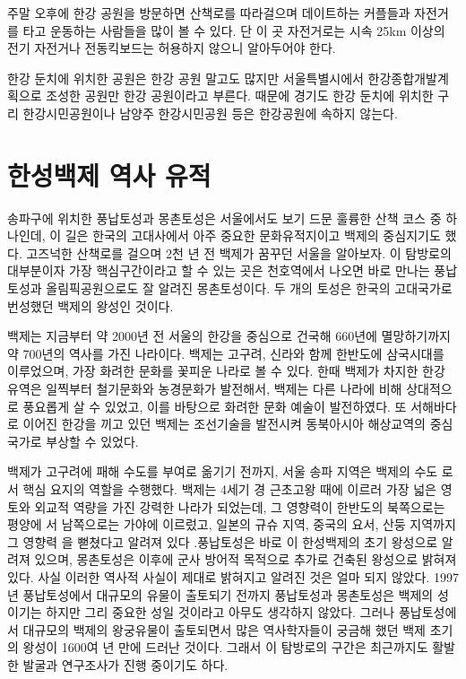 주말 오후에 한강 공원을 방문하면 산책로를 따라걸으며 데이트하는 커플들과 자전거를
타고 운동하는 사람들을 많이 볼 수 있다. 단 이 곳 자전거로는 시속 25km 이상의
전기 자전거나 전동킥보드는 허용하지 않으니 알아두어야 한다.

한강 둔치에 위치한 공원은 한강 공원 말고도 많지만 서울특별시에서 한강종합개발계획으로
조성한 공원만 한강 공원이라고 부른다. 때문에 경기도 한강 둔치에 위치한 구리
한강시민공원이나 남양주 한강시민공원 등은 한강공원에 속하지 않는다.


\section{한성백제 역사 유적}
송파구에 위치한 풍납토성과 몽촌토성은 서울에서도 보기 드문 훌륭한 산책 코스 중
하나인데, 이 길은 한국의 고대사에서 아주 중요한 문화유적지이고 백제의 중심지기도 했다.
고즈넉한 산책로를 걸으며 2천 년 전 백제가 꿈꾸던 서울을 알아보자.
이 탐방로의 대부분이자 가장 핵심구간이라고 할 수 있는 곳은 천호역에서 나오면 바로
만나는 풍납토성과 올림픽공원으로도 잘 알려진 몽촌토성이다. 두 개의 토성은 한국의
고대국가로 번성했던 백제의 왕성인 것이다.


백제는 지금부터 약 2000년 전 서울의 한강을 중심으로 건국해 660년에 멸망하기까지
약 700년의 역사를 가진 나라이다. 백제는 고구려, 신라와 함께 한반도에 삼국시대를
이루었으며, 가장 화려한 문화를 꽃피운 나라로 볼 수 있다. 한때 백제가 차지한 한강 유역은
일찍부터 철기문화와 농경문화가 발전해서, 백제는 다른 나라에 비해 상대적으로 풍요롭게
살 수 있었고, 이를 바탕으로 화려한 문화 예술이 발전하였다. 또 서해바다로 이어진
한강을 끼고 있던 백제는 조선기술을 발전시켜 동북아시아 해상교역의 중심국가로 부상할
수 있었다.


백제가 고구려에 패해 수도를 부여로 옮기기 전까지, 서울 송파 지역은 백제의 수도
로서 핵심 요지의 역할을 수행했다. 백제는 4세기 경 근초고왕 때에 이르러 가장 넓은 영토와 
외교적 역량을 가진 강력한 나라가 되었는데, 그 영향력이 한반도의 북쪽으로는 평양에
서 남쪽으로는 가야에 이르렀고, 일본의 규슈 지역, 중국의 요서, 산둥 지역까지 그 영향력
을 뻗쳤다고 알려져 있다 .풍납토성은 바로 이 한성백제의 초기 왕성으로 알려져 있으며,
몽촌토성은 이후에 군사 방어적 목적으로 추가로 건축된 왕성으로 밝혀져 있다. 사실 이러한
역사적 사실이 제대로 밝혀지고 알려진 것은 얼마 되지 않았다. 1997년 풍납토성에서
대규모의 유물이 출토되기 전까지 풍납토성과 몽촌토성은 백제의 성이기는 하지만 그리 
중요한 성일 것이라고 아무도 생각하지 않았다. 그러나 풍납토성에서 대규모의 백제의 
왕궁유물이 출토되면서 많은 역사학자들이 궁금해 했던 백제 초기의 왕성이 1600여 년 만에
드러난 것이다. 그래서 이 탐방로의 구간은 최근까지도 활발한 발굴과 연구조사가 진행 
중이기도 하다.

